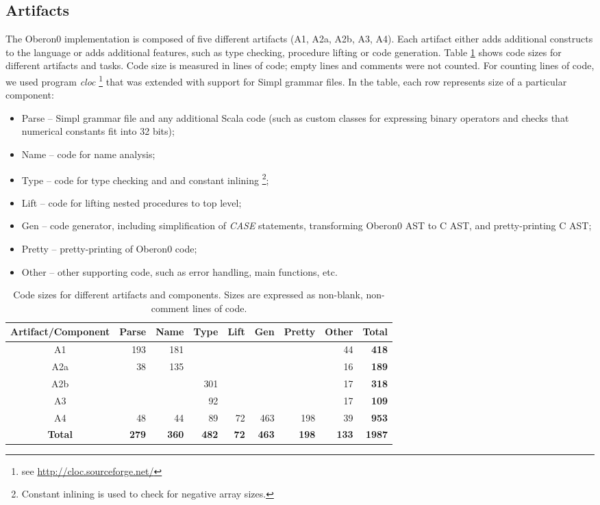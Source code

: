 \subsection{Artifacts}

The Oberon0 implementation is composed of five different artifacts
(A1, A2a, A2b, A3, A4). Each artifact either adds additional constructs
to the language or adds additional features, such as type checking,
procedure lifting or code generation. Table \ref{tab:loc-statistics}
shows code sizes for different artifacts and tasks. Code size is measured
in lines of code; empty lines and comments were not counted. For counting
lines of code, we used program \emph{cloc}%
\footnote{see \url{http://cloc.sourceforge.net/}%
} that was extended with support for Simpl grammar files. In the table,
each row represents size of a particular component:
\begin{itemize}
\item Parse -- Simpl grammar file and any additional Scala code (such as
custom classes for expressing binary operators and checks that numerical
constants fit into 32 bits);
\item Name -- code for name analysis;
\item Type -- code for type checking and and constant inlining%
\footnote{Constant inlining is used to check for negative array sizes.%
};
\item Lift -- code for lifting nested procedures to top level;
\item Gen -- code generator, including simplification of \emph{CASE} statements,
transforming Oberon0 AST to C AST, and pretty-printing C AST;
\item Pretty -- pretty-printing of Oberon0 code;
\item Other -- other supporting code, such as error handling, main functions,
etc.
\end{itemize}
%
\begin{table}[!h]
\caption{\label{tab:loc-statistics}Code sizes for different artifacts and
components. Sizes are expressed as non-blank, non-comment lines of
code.}


\noindent \centering{}\begin{tabular}{|c|r|r|r|r|r|r|r|r|}
\hline 
Artifact/Component & Parse & Name & Type & Lift & Gen & Pretty & Other & \textbf{Total}\tabularnewline
\hline
\hline 
A1 & 193 & 181 &  &  &  &  & 44 & \textbf{418}\tabularnewline
\hline 
A2a & 38 & 135 &  &  &  &  & 16 & \textbf{189}\tabularnewline
\hline 
A2b &  &  & 301 &  &  &  & 17 & \textbf{318}\tabularnewline
\hline 
A3 &  &  & 92 &  &  &  & 17 & \textbf{109}\tabularnewline
\hline 
A4 & 48 & 44 & 89 & 72 & 463 & 198 & 39 & \textbf{953}\tabularnewline
\hline 
\textbf{Total} & \textbf{279} & \textbf{360} & \textbf{482} & \textbf{72} & \textbf{463} & \textbf{198} & \textbf{133} & \textbf{1987}\tabularnewline
\hline
\end{tabular}
\end{table}


